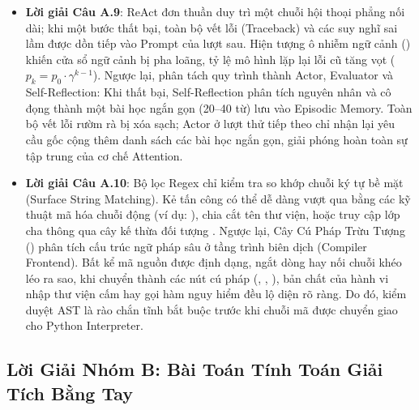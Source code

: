 \begin{itemize}
  \item \textbf{Lời giải Câu A.9}:
  ReAct đơn thuần duy trì một chuỗi hội thoại phẳng nối dài; khi một bước thất bại, toàn bộ vết lỗi (Traceback) và các suy nghĩ sai lầm được dồn tiếp vào Prompt của lượt sau. Hiện tượng ô nhiễm ngữ cảnh () khiến cửa sổ ngữ cảnh bị pha loãng, tỷ lệ mô hình lặp lại lỗi cũ tăng vọt ($p_k = p_0 \cdot \gamma^{k-1}$). Ngược lại,  phân tách quy trình thành Actor, Evaluator và Self-Reflection: Khi thất bại, Self-Reflection phân tích nguyên nhân và cô đọng thành một bài học ngắn gọn (20--40 từ) lưu vào Episodic Memory. Toàn bộ vết lỗi rườm rà bị xóa sạch; Actor ở lượt thử tiếp theo chỉ nhận lại yêu cầu gốc cộng thêm danh sách các bài học ngắn gọn, giải phóng hoàn toàn sự tập trung của cơ chế Attention.

  \item \textbf{Lời giải Câu A.10}:
  Bộ lọc Regex chỉ kiểm tra so khớp chuỗi ký tự bề mặt (Surface String Matching). Kẻ tấn công có thể dễ dàng vượt qua bằng các kỹ thuật mã hóa chuỗi động (ví dụ: ), chia cắt tên thư viện, hoặc truy cập lớp cha thông qua cây kế thừa đối tượng .
  Ngược lại, Cây Cú Pháp Trừu Tượng () phân tích cấu trúc ngữ pháp sâu ở tầng trình biên dịch (Compiler Frontend). Bất kể mã nguồn được định dạng, ngắt dòng hay nối chuỗi khéo léo ra sao, khi chuyển thành các nút cú pháp (, , ), bản chất của hành vi nhập thư viện cấm hay gọi hàm nguy hiểm đều lộ diện rõ ràng. Do đó, kiểm duyệt AST là rào chắn tĩnh bắt buộc trước khi chuỗi mã được chuyển giao cho Python Interpreter.
\end{itemize}

\subsection{Lời Giải Nhóm B: Bài Toán Tính Toán Giải Tích Bằng Tay}

